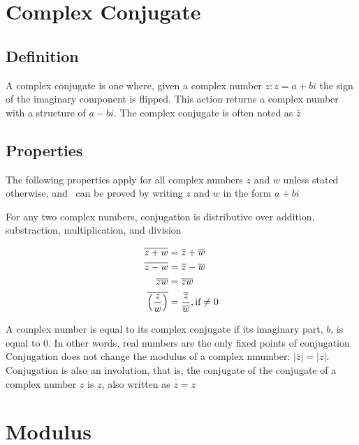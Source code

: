 \documentclass[12pt]{article}
\begin{document}
    \section{Complex Conjugate}
    \subsection{Definition}

    A complex conjugate is one where, given a complex number $z: z = a + bi$ the sign 
    of the imaginary component is flipped. This action returns a complex number with a 
    structure of $a - bi$. The complex conjugate is often noted as $\bar{z}$

    \subsection{Properties}
        
    The following properties apply for all complex numbers $z$ and $w$ unless stated otherwise, and \
    can be proved by writing $z$ and $w$ in the form $a + bi$

    For any two complex numbers, conjugation is distributive over addition, substraction, multiplication, and division

    \[
        \begin{aligned}
            \overline{z + w} &= \overline{z} + \overline{w}\\
            \overline{z - w} &= \overline{z} - \overline{w}\\
            \overline{zw} &= \overline{z}\overline{w}\\
            \overline{\left(\frac{z}{w}\right)} &= \frac{\overline{z}}{\overline{w}}, \space\text{if} \space\ne0
        \end{aligned}    
    \]

    A complex number is equal to its complex conjugate if its imaginary part, $b$, is equal to $0$. In other words, real numbers
    are the only fixed points of conjugation
    Conjugation does not change the modulus of a complex nmumber: $|\overline{z}| = |z|$. Conjugation is also an involution, that is, 
    the conjugate of the conjugate of a complex number $z$ is $z$, also written as $\overline{\overline{z}} = z$

    \section{Modulus}
\end{document}
